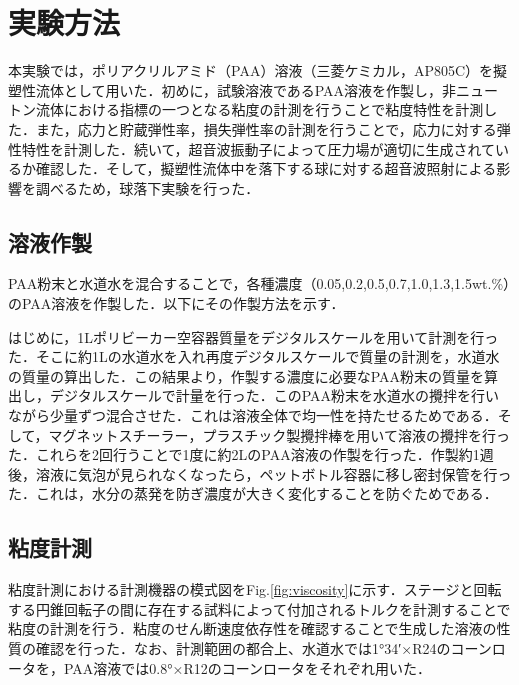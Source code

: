 \section{実験方法}
\label{sec:methods}
本実験では，ポリアクリルアミド（PAA）溶液（三菱ケミカル，AP805C）を擬塑性流体として用いた．初めに，試験溶液であるPAA溶液を作製し，非ニュートン流体における指標の一つとなる粘度の計測を行うことで粘度特性を計測した．また，応力と貯蔵弾性率，損失弾性率の計測を行うことで，応力に対する弾性特性を計測した．続いて，超音波振動子によって圧力場が適切に生成されているか確認した．そして，擬塑性流体中を落下する球に対する超音波照射による影響を調べるため，球落下実験を行った．

\subsection{溶液作製}

PAA粉末と水道水を混合することで，各種濃度（0.05,0.2,0.5,0.7,1.0,1.3,1.5wt.\%）のPAA溶液を作製した．以下にその作製方法を示す．

はじめに，1Lポリビーカー空容器質量をデジタルスケールを用いて計測を行った．そこに約1Lの水道水を入れ再度デジタルスケールで質量の計測を，水道水の質量の算出した．この結果より，作製する濃度に必要なPAA粉末の質量を算出し，デジタルスケールで計量を行った．このPAA粉末を水道水の攪拌を行いながら少量ずつ混合させた．これは溶液全体で均一性を持たせるためである．そして，マグネットスチーラー，プラスチック製攪拌棒を用いて溶液の攪拌を行った．これらを2回行うことで1度に約2LのPAA溶液の作製を行った．作製約1週後，溶液に気泡が見られなくなったら，ペットボトル容器に移し密封保管を行った．これは，水分の蒸発を防ぎ濃度が大きく変化することを防ぐためである．

\subsection{粘度計測}
粘度計測における計測機器の模式図をFig.\ref{fig:viscosity}に示す．ステージと回転する円錐回転子の間に存在する試料によって付加されるトルクを計測することで粘度の計測を行う．粘度のせん断速度依存性を確認することで生成した溶液の性質の確認を行った．なお、計測範囲の都合上、水道水では1°34′×R24のコーンロータを，PAA溶液では0.8°×R12のコーンロータをそれぞれ用いた．

